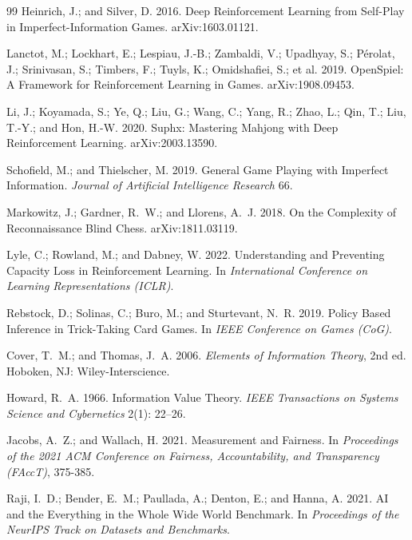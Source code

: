 \begin{thebibliography}{99}
Heinrich, J.; and Silver, D. 2016. Deep Reinforcement Learning from Self-Play in Imperfect-Information Games. arXiv:1603.01121.

Lanctot, M.; Lockhart, E.; Lespiau, J.-B.; Zambaldi, V.; Upadhyay, S.; P\'{e}rolat, J.; Srinivasan, S.; Timbers, F.; Tuyls, K.; Omidshafiei, S.; et al. 2019. OpenSpiel: A Framework for Reinforcement Learning in Games. arXiv:1908.09453.

Li, J.; Koyamada, S.; Ye, Q.; Liu, G.; Wang, C.; Yang, R.; Zhao, L.; Qin, T.; Liu, T.-Y.; and Hon, H.-W. 2020. Suphx: Mastering Mahjong with Deep Reinforcement Learning. arXiv:2003.13590.

Schofield, M.; and Thielscher, M. 2019. General Game Playing with Imperfect Information. \emph{Journal of Artificial Intelligence Research} 66.

Markowitz, J.; Gardner, R.~W.; and Llorens, A.~J. 2018. On the Complexity of Reconnaissance Blind Chess. arXiv:1811.03119.

Lyle, C.; Rowland, M.; and Dabney, W. 2022. Understanding and Preventing Capacity Loss in Reinforcement Learning. In \emph{International Conference on Learning Representations (ICLR)}.

Rebstock, D.; Solinas, C.; Buro, M.; and Sturtevant, N.~R. 2019. Policy Based Inference in Trick-Taking Card Games. In \emph{IEEE Conference on Games (CoG)}.

Cover, T.~M.; and Thomas, J.~A. 2006. \newblock \emph{Elements of Information Theory}, 2nd ed. \newblock Hoboken, NJ: Wiley-Interscience.

Howard, R.~A. 1966. \newblock Information Value Theory. \newblock \emph{IEEE Transactions on Systems Science and Cybernetics} 2(1): 22--26.

Jacobs, A.~Z.; and Wallach, H. 2021. Measurement and Fairness. In \emph{Proceedings of the 2021 ACM Conference on Fairness, Accountability, and Transparency (FAccT)}, 375-385.

Raji, I.~D.; Bender, E.~M.; Paullada, A.; Denton, E.; and Hanna, A. 2021. AI and the Everything in the Whole Wide World Benchmark. In \emph{Proceedings of the NeurIPS Track on Datasets and Benchmarks}.


\end{thebibliography}

